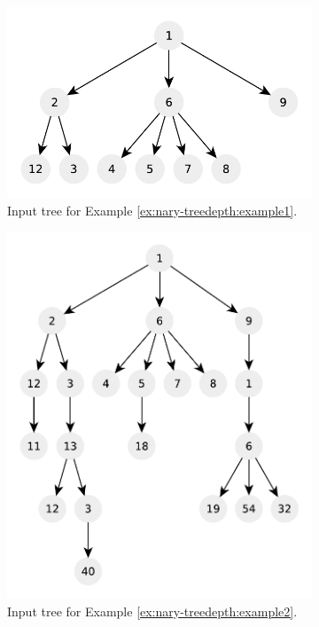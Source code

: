  
\begin{figure}
	\centering
	\begin{subfigure}[]{0.45\textwidth}
		\includegraphics[width=1\linewidth]{sources/mini_problems/n-ary-tree-depth/images/example1}
		\caption{Input tree for Example \ref{ex:nary-treedepth:example1}.}
		\label{fig:longest_consecutive_sequence:example1}
	 \end{subfigure}
	\hfill
	\begin{subfigure}[]{0.45\textwidth}
		\includegraphics[width=1\linewidth]{sources/mini_problems/n-ary-tree-depth/images/example2}
		\caption{Input tree for Example \ref{ex:nary-treedepth:example2}.}
		\label{fig:longest_consecutive_sequence:example1}
	 \end{subfigure}
	 \caption[]{}
	  \label{}
\end{figure}
    
